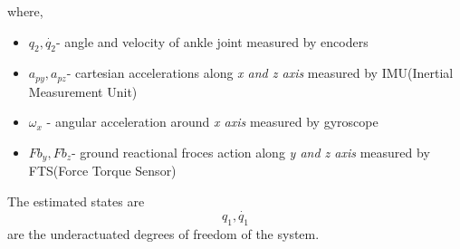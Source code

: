 where,
\begin{itemize}
\item
 $q_2, \dot{q_2}$- angle and velocity of ankle joint measured by encoders
\item 
$a_{py},a_{pz}$- cartesian accelerations along \emph{x and z axis} measured by IMU(Inertial Measurement Unit)
\item
$\omega_x$ - angular acceleration around \emph{x axis} measured by gyroscope
\item
$Fb_y,Fb_z$- ground reactional froces action along \emph{ y and z axis} measured by FTS(Force Torque Sensor)
\end{itemize}
The estimated states are $$q_1, \dot{q_1}$$ are the underactuated degrees of freedom of the system.
